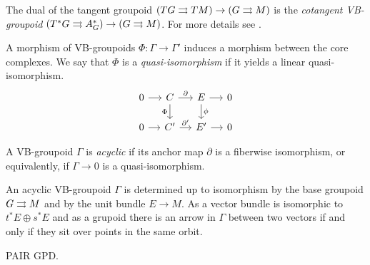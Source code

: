\begin{example}
The dual of the tangent groupoid $(TG\rightrightarrows TM)\to (G\rightrightarrows M)$ is the \emph{cotangent VB-groupoid} $(T^*G\rightrightarrows A_G^*)\to (G\rightrightarrows M)$. For more details see \cite{mack05}.
\end{example}

A morphism of VB-groupoids $\Phi\colon\Gamma\to\Gamma'$ induces a morphism between the core complexes.
We say that $\Phi$ is a \emph{quasi-isomorphism} if it yields a linear quasi-isomorphism.
\begin{equation}
  \begin{tikzcd}[column sep=small, row sep=3.5ex]
    0 \ar{r} & C \ar{r}{\partial} \ar[swap]{d}{\Phi} & E \ar{d}{\phi} \ar{r} & 0 \\
    0 \ar{r} & C' \ar{r}{\partial'} & E' \ar{r} & 0
  \end{tikzcd}
\end{equation}

A VB-groupoid $\Gamma$ is \emph{acyclic} if its anchor map $\partial$ is a fiberwise isomorphism, or equivalently, if $\Gamma\to 0$ is a quasi-isomorphism.

\begin{prop}
An acyclic VB-groupoid $\Gamma$ is determined up to isomorphism by the base groupoid $G\rightrightarrows M$ and by the unit bundle $E\to M$.
As a vector bundle is isomorphic to $t^*E\oplus s^*E$ and as a grupoid there is an arrow in $\Gamma$ between two vectors if and only if they sit over points in the same orbit.
\end{prop}

\begin{example}
PAIR GPD.
\end{example}
